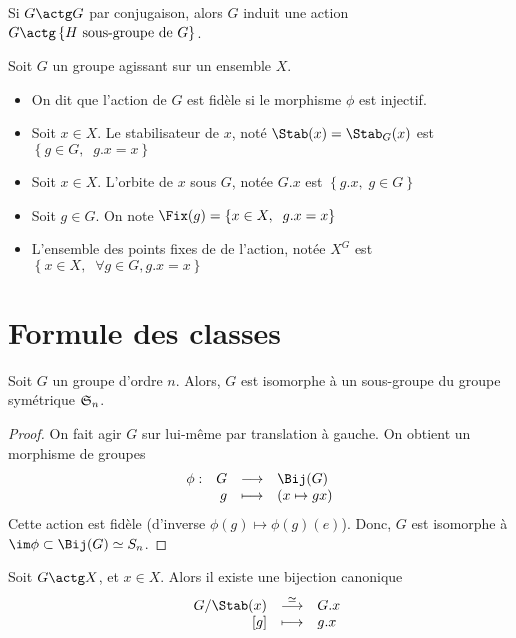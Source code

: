 \begin{ex}
    Si $G\actg G$ par conjugaison, alors  $G$ induit une action  $G\actg \left\{ H \text{ sous-groupe de  }G \right\} $.
\end{ex}

\begin{dfn}
Soit $G$ un groupe agissant sur un ensemble  $X$.  \begin{itemize}
    \item On dit que l'action de $G$ est fidèle  si le morphisme $\phi$ est injectif. 
    \item Soit $x \in  X$. Le stabilisateur de $x$, noté  $\Stab(x)=\Stab_G(x)$ est  $\left\{ g \in  G, \;\; g.x=x \right\} $
    \item Soit $x \in  X$. L'orbite de $x$ sous  $G$, notée  $G.x$ est $\left\{ g.x, \;g \in  G \right\} $ 
    \item Soit $g \in  G$. On note $\Fix(g) = \left\{ x \in  X, \;\;g.x=x \right\} $
    \item L'ensemble des points fixes de de l'action, notée $X^G$ est  $\left\{ x \in  X, \;\; \forall  g \in  G, g.x=x \right\} $
\end{itemize}
\end{dfn}

\section{Formule des classes}

\begin{thm}
Soit $G$ un groupe d'ordre  $n$. Alors,  $G$ est isomorphe à un sous-groupe du groupe symétrique  $\mathfrak S_n$.
\end{thm}

\begin{proof}
On fait agir $G$ sur lui-même par translation à gauche. On obtient un morphisme de groupes  \[
\begin{array}{rrcl}
    \phi:& G & \longrightarrow & \Bij(G) \\
         & g & \longmapsto & \displaystyle (x \mapsto gx)
\end{array}
\] 
Cette action est fidèle (d'inverse $\phi(g)\mapsto \phi(g)(e)$). Donc, $G$ est isomorphe à $\im \phi \subset \Bij(G)\simeq S_n$.
\end{proof}

\begin{prop}
Soit $G\actg X$, et  $x \in  X$. Alors il existe une bijection canonique \[
\begin{array}{rrcl}
    & G / \Stab(x) & \overset\simeq\longrightarrow & G.x \\
    & [g] & \longmapsto & \displaystyle g.x
\end{array}
\] 
\end{prop}

